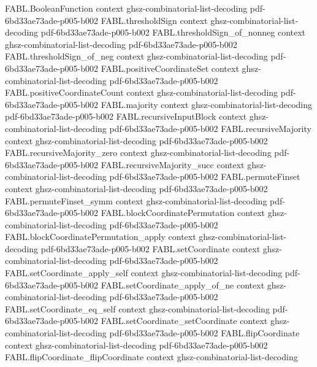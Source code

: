 \begin{theorem}
\proofstep
  {FABL.BooleanFunction}
  {context}
  {ghsz-combinatorial-list-decoding}
  {pdf-6bd33ae73ade-p005-b002}
\proofstep
  {FABL.thresholdSign}
  {context}
  {ghsz-combinatorial-list-decoding}
  {pdf-6bd33ae73ade-p005-b002}
\proofstep
  {FABL.thresholdSign_of_nonneg}
  {context}
  {ghsz-combinatorial-list-decoding}
  {pdf-6bd33ae73ade-p005-b002}
\proofstep
  {FABL.thresholdSign_of_neg}
  {context}
  {ghsz-combinatorial-list-decoding}
  {pdf-6bd33ae73ade-p005-b002}
\proofstep
  {FABL.positiveCoordinateSet}
  {context}
  {ghsz-combinatorial-list-decoding}
  {pdf-6bd33ae73ade-p005-b002}
\proofstep
  {FABL.positiveCoordinateCount}
  {context}
  {ghsz-combinatorial-list-decoding}
  {pdf-6bd33ae73ade-p005-b002}
\proofstep
  {FABL.majority}
  {context}
  {ghsz-combinatorial-list-decoding}
  {pdf-6bd33ae73ade-p005-b002}
\proofstep
  {FABL.recursiveInputBlock}
  {context}
  {ghsz-combinatorial-list-decoding}
  {pdf-6bd33ae73ade-p005-b002}
\proofstep
  {FABL.recursiveMajority}
  {context}
  {ghsz-combinatorial-list-decoding}
  {pdf-6bd33ae73ade-p005-b002}
\proofstep
  {FABL.recursiveMajority_zero}
  {context}
  {ghsz-combinatorial-list-decoding}
  {pdf-6bd33ae73ade-p005-b002}
\proofstep
  {FABL.recursiveMajority_succ}
  {context}
  {ghsz-combinatorial-list-decoding}
  {pdf-6bd33ae73ade-p005-b002}
\proofstep
  {FABL.permuteFinset}
  {context}
  {ghsz-combinatorial-list-decoding}
  {pdf-6bd33ae73ade-p005-b002}
\proofstep
  {FABL.permuteFinset_symm}
  {context}
  {ghsz-combinatorial-list-decoding}
  {pdf-6bd33ae73ade-p005-b002}
\proofstep
  {FABL.blockCoordinatePermutation}
  {context}
  {ghsz-combinatorial-list-decoding}
  {pdf-6bd33ae73ade-p005-b002}
\proofstep
  {FABL.blockCoordinatePermutation_apply}
  {context}
  {ghsz-combinatorial-list-decoding}
  {pdf-6bd33ae73ade-p005-b002}
\proofstep
  {FABL.setCoordinate}
  {context}
  {ghsz-combinatorial-list-decoding}
  {pdf-6bd33ae73ade-p005-b002}
\proofstep
  {FABL.setCoordinate_apply_self}
  {context}
  {ghsz-combinatorial-list-decoding}
  {pdf-6bd33ae73ade-p005-b002}
\proofstep
  {FABL.setCoordinate_apply_of_ne}
  {context}
  {ghsz-combinatorial-list-decoding}
  {pdf-6bd33ae73ade-p005-b002}
\proofstep
  {FABL.setCoordinate_eq_self}
  {context}
  {ghsz-combinatorial-list-decoding}
  {pdf-6bd33ae73ade-p005-b002}
\proofstep
  {FABL.setCoordinate_setCoordinate}
  {context}
  {ghsz-combinatorial-list-decoding}
  {pdf-6bd33ae73ade-p005-b002}
\proofstep
  {FABL.flipCoordinate}
  {context}
  {ghsz-combinatorial-list-decoding}
  {pdf-6bd33ae73ade-p005-b002}
\proofstep
  {FABL.flipCoordinate_flipCoordinate}
  {context}
  {ghsz-combinatorial-list-decoding}

\end{theorem}
